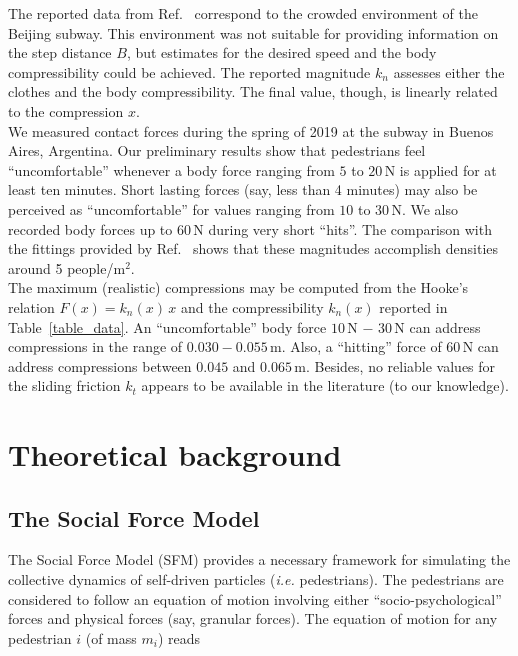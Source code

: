\documentclass[preprint,12pt]{elsarticle}
\begin{document}
The reported data from Ref.~\cite{song_2019} correspond to the crowded
environment of the Beijing subway. This environment was not suitable for
providing information on the step distance $B$, but estimates for the  desired
speed and the body compressibility could be achieved. The reported  magnitude
$k_n$ assesses either the clothes and the body compressibility. The  final
value, though, is linearly related to the compression $x$. \\

We measured  contact forces during the spring of 2019 at the subway in Buenos
Aires,  Argentina. Our preliminary results show that pedestrians feel
``uncomfortable''  whenever a body force ranging from $5$ to $20\,$N is applied
for at least ten  minutes. Short lasting forces (say, less than 4 minutes) may
also be perceived  as ``uncomfortable'' for values ranging from $10$ to $30\,$N.
We also recorded body  forces up to $60\,$N during very short ``hits''. The
comparison with the  fittings provided by Ref.~\cite{song_2019} shows that these
magnitudes  accomplish densities around 5 people/m$^2$.     \\

The maximum (realistic) compressions may be computed from the Hooke's relation
$F(x)=k_n(x)\,x$ and the compressibility $k_n(x)$ reported in
Table~\ref{table_data}.  An ``uncomfortable'' body force  $10\,$N $-$ $30\,$N
can address compressions in the  range of $0.030-0.055\,$m. Also, a ``hitting''
force of $60\,$N can address  compressions between $0.045$ and $0.065\,$m.
Besides, no reliable values for the sliding friction $k_t$ appears to be
available in the literature (to our knowledge).\\


\section{\label{background}Theoretical background}

\subsection{\label{sfm}The Social Force Model}

The Social Force Model (SFM) provides a necessary framework for simulating  the
collective dynamics of self-driven particles (\textit{i.e.} pedestrians).  The
pedestrians are considered to follow an equation of motion involving  either
``socio-psychological'' forces and physical forces (say, granular  forces). The
equation of motion for any pedestrian $i$ (of mass $m_i$) reads
\end{document}

